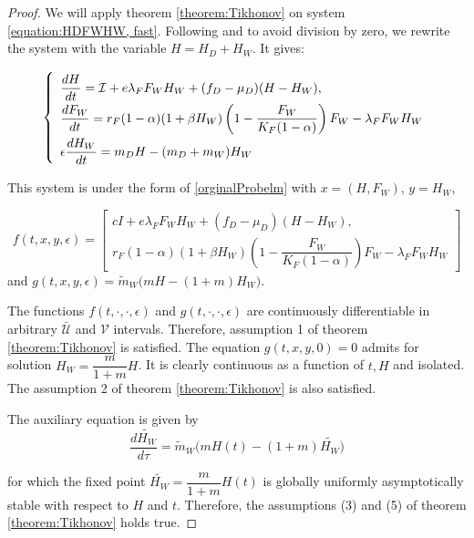 \documentclass{article}
\newcommand{\lfw}{\lambda_{F}}
\newcommand{\lfw}{\lambda_{F}}
\newcommand{\cI}{\mathcal{I}}
\newcommand{\mW}{\tilde{m}_W}
\begin{document}
\begin{proof}
We will apply theorem \ref{theorem:Tikhonov} on system \eqref{equation:HDFWHW, fast}. Following \cite{banasiak_methods_2014} and to avoid division by zero, we rewrite the system with the variable $H = H_D + H_W$. It gives:

\begin{equation*} 
\def\arraystretch{2}
\left\{ 
\begin{array}{l}
\dfrac{dH}{dt}= \cI + e\lfw F_WH_W + (f_D - \mu_D)(H - H_W), \\
\dfrac{dF_W}{dt} = r_F(1- \alpha) (1+ \beta H_W) \left(1 - \dfrac{F_W}{K_F(1-\alpha)} \right) F_W - \lfw F_W H_W \\
\epsilon \dfrac{dH_W}{dt}= m_D H - (m_D + m_W) H_W
\end{array} \right.
\label{equation:HFWHW} 
\end{equation*}

This system 
is under the form of \eqref{orginalProbelm} with $x = (H, F_W)$, $y = H_W$,  

$$f(t,x,y,\epsilon) = \begin{bmatrix}
cI + e\lfw F_W H_W + (f_D - \mu_D) (H - H_W), \\
r_F(1- \alpha) (1+ \beta H_W) \left(1 - \dfrac{F_W}{K_F(1-\alpha)} \right) F_W - \lfw F_W H_W
\end{bmatrix}  $$
and $g(t,x,y,\epsilon) = \mW \Big(m H - (1 + m)H_W \Big) $.

The functions $f(t, \cdot, \cdot, \epsilon)$ and $g(t, \cdot, \cdot, \epsilon)$ are continuously differentiable in arbitrary $\mathcal{\bar{U}}$ and $\mathcal{V}$ intervals. Therefore, assumption 1 of theorem \ref{theorem:Tikhonov} is satisfied. The equation $ g(t,x,y,0) =  0$ admits for solution $H_W = \dfrac{m}{1+m}H$. It is clearly continuous as a function of $t, H$ and isolated. The assumption 2 of theorem \ref{theorem:Tikhonov} is also satisfied.

The auxiliary equation is given by
\begin{equation*}
\dfrac{d \tilde{H_W}}{d \tau} = \mW \Big(m H(t) - (1 + m)\tilde{H_W} \Big)
\end{equation*}

for which the fixed point $\tilde{H_W} = \dfrac{m}{1+m}H(t)$ is globally uniformly asymptotically stable with respect to $H$ and $t$. Therefore, the assumptions (3) and (5) of theorem \ref{theorem:Tikhonov} holds true.


\end{proof}
\end{document}
